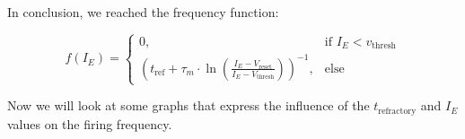 In conclusion, we reached the frequency function:

\begin{equation}
f(I_E) = \begin{cases}
    0, & \text{if } I_E < v_{\text{thresh}} \\
    \left(t_{\text{ref}} + \tau_m \cdot \ln\left(\frac{I_E - V_{\text{reset}}}{I_E - V_{\text{thresh}}}\right)\right)^{-1}, & \text{else}
\end{cases}
\end{equation}

Now we will look at some graphs that express the influence of the \( t_{\text{refractory}} \) and \( I_E \) values on the firing frequency.
